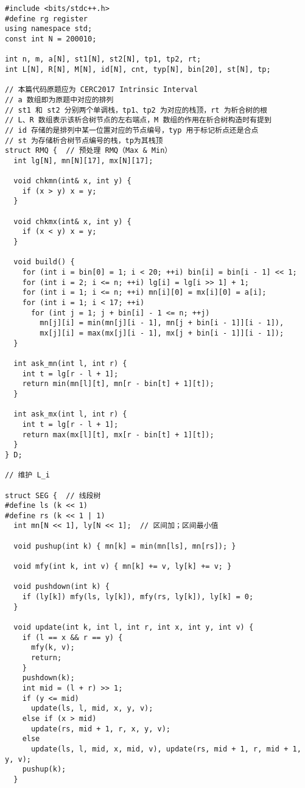 \documentclass{ctexart}
\begin{document}
\begin{lstlisting}
#include <bits/stdc++.h>
#define rg register
using namespace std;
const int N = 200010;

int n, m, a[N], st1[N], st2[N], tp1, tp2, rt;
int L[N], R[N], M[N], id[N], cnt, typ[N], bin[20], st[N], tp;

// 本篇代码原题应为 CERC2017 Intrinsic Interval
// a 数组即为原题中对应的排列
// st1 和 st2 分别两个单调栈，tp1、tp2 为对应的栈顶，rt 为析合树的根
// L、R 数组表示该析合树节点的左右端点，M 数组的作用在析合树构造时有提到
// id 存储的是排列中某一位置对应的节点编号，typ 用于标记析点还是合点
// st 为存储析合树节点编号的栈，tp为其栈顶
struct RMQ {  // 预处理 RMQ（Max & Min）
  int lg[N], mn[N][17], mx[N][17];

  void chkmn(int& x, int y) {
    if (x > y) x = y;
  }

  void chkmx(int& x, int y) {
    if (x < y) x = y;
  }

  void build() {
    for (int i = bin[0] = 1; i < 20; ++i) bin[i] = bin[i - 1] << 1;
    for (int i = 2; i <= n; ++i) lg[i] = lg[i >> 1] + 1;
    for (int i = 1; i <= n; ++i) mn[i][0] = mx[i][0] = a[i];
    for (int i = 1; i < 17; ++i)
      for (int j = 1; j + bin[i] - 1 <= n; ++j)
        mn[j][i] = min(mn[j][i - 1], mn[j + bin[i - 1]][i - 1]),
        mx[j][i] = max(mx[j][i - 1], mx[j + bin[i - 1]][i - 1]);
  }

  int ask_mn(int l, int r) {
    int t = lg[r - l + 1];
    return min(mn[l][t], mn[r - bin[t] + 1][t]);
  }

  int ask_mx(int l, int r) {
    int t = lg[r - l + 1];
    return max(mx[l][t], mx[r - bin[t] + 1][t]);
  }
} D;

// 维护 L_i

struct SEG {  // 线段树
#define ls (k << 1)
#define rs (k << 1 | 1)
  int mn[N << 1], ly[N << 1];  // 区间加；区间最小值

  void pushup(int k) { mn[k] = min(mn[ls], mn[rs]); }

  void mfy(int k, int v) { mn[k] += v, ly[k] += v; }

  void pushdown(int k) {
    if (ly[k]) mfy(ls, ly[k]), mfy(rs, ly[k]), ly[k] = 0;
  }

  void update(int k, int l, int r, int x, int y, int v) {
    if (l == x && r == y) {
      mfy(k, v);
      return;
    }
    pushdown(k);
    int mid = (l + r) >> 1;
    if (y <= mid)
      update(ls, l, mid, x, y, v);
    else if (x > mid)
      update(rs, mid + 1, r, x, y, v);
    else
      update(ls, l, mid, x, mid, v), update(rs, mid + 1, r, mid + 1, y, v);
    pushup(k);
  }


\end{lstlisting}
\end{document}

